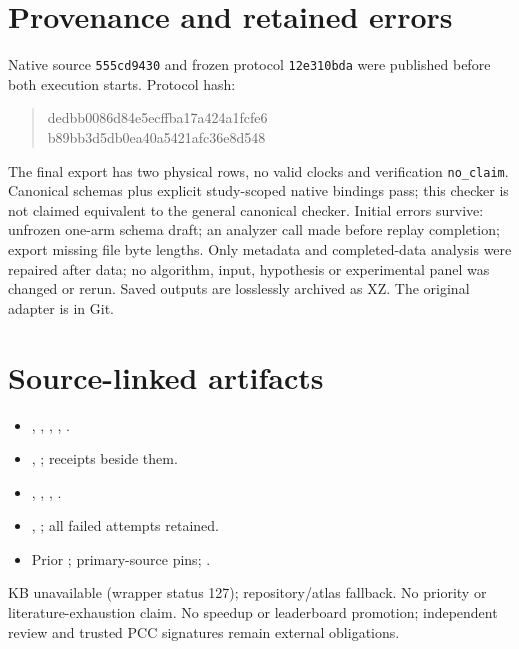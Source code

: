 \documentclass[10pt]{article}
\begin{document}
\section*{Provenance and retained errors}
Native source \texttt{555cd9430} and frozen protocol \texttt{12e310bda}
were published before both execution starts. Protocol hash:
\begin{quote}\ttfamily\small
 dedbb0086d84e5ecffba17a424a1fcfe6\\
 b89bb3d5db0ea40a5421afc36e8d548
\end{quote}
The final export has two physical rows, no valid clocks and verification
\texttt{no\_claim}. Canonical schemas plus explicit study-scoped native
bindings pass; this checker is not claimed equivalent to the general canonical
checker. Initial errors survive: unfrozen one-arm schema draft; an analyzer
call made before replay completion; export missing file byte lengths.
Only metadata and completed-data analysis were repaired after data; no
algorithm, input, hypothesis or experimental panel was changed or rerun.
Saved outputs are losslessly archived as XZ. The original adapter is in Git.

\section*{Source-linked artifacts}
\begin{itemize}
\item {}, ,
 , , .
\item {}, ; receipts beside them.
\item {}, ,
 , .
\item {}, ; all failed attempts retained.
\item Prior ;
  primary-source pins;
 .
\end{itemize}
KB unavailable (wrapper status 127); repository/atlas fallback. No priority or
literature-exhaustion claim. No speedup or leaderboard promotion; independent
review and trusted PCC signatures remain external obligations.
\end{document}
